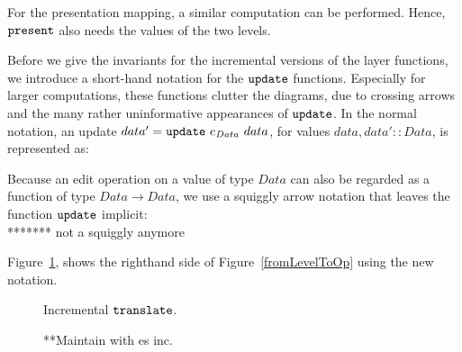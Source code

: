 For the presentation mapping, a similar computation can be performed. Hence, ${\tt present}$ also needs the values of the two levels. 

Before we give the invariants for the incremental versions of the layer functions, we introduce a short-hand notation for the ${\tt update}$ functions. Especially for larger computations, these functions clutter the diagrams, due to crossing arrows and the many rather uninformative appearances of ${\tt update}$. In the normal notation, an update $data' = {\tt update}~e_{Data}~data$, for values 
$data, data' :: Data$, is represented as:\\


\smallskip
Because an edit operation on a value of type $Data$ can also be regarded as a function of type 
$Data \rightarrow Data$, we use a squiggly arrow notation that leaves the function ${\tt update}$ implicit:\\
******* not a squiggly anymore


Figure~\ref{incrementalTranslate}, shows the righthand side of Figure~\ref{fromLevelToOp} using the new notation.

\begin{figure}
\begin{small}
\begin{center}
\begin{center}
\begin{small}
\bigskip \noindent
{}
\end{small}
\end{center}\caption{Incremental ${\tt translate}$.}\label{incrementalTranslate} 
\end{center}
\end{small}
\end{figure}

\begin{figure}
\begin{center}
\begin{center}
\end{center}
\caption{**Maintain with es inc.}\label{layerExtraStateInc} 
\end{center}
\end{figure}

